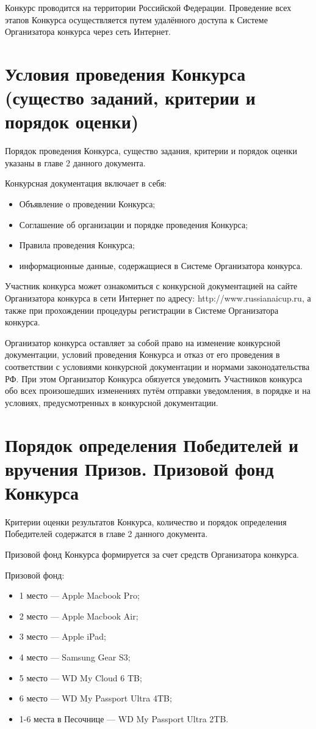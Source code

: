 Конкурс проводится на территории Российской Федерации. Проведение всех этапов Конкурса осуществляется путем удалённого доступа к Системе
Организатора конкурса через сеть Интернет.

\section{Условия проведения Конкурса (существо заданий, критерии и порядок оценки)}

Порядок проведения Конкурса, существо задания, критерии и порядок оценки указаны в главе 2 данного документа.

Конкурсная документация включает в себя:
\begin{itemize}
\item Объявление о проведении Конкурса;
\item Соглашение об организации и порядке проведения Конкурса;
\item Правила проведения Конкурса;
\item информационные данные, содержащиеся в Системе Организатора конкурса.
\end{itemize}

Участник конкурса может ознакомиться с конкурсной документацией на сайте Организатора конкурса в сети Интернет по адресу:
http://www.russianaicup.ru, а также при прохождении процедуры регистрации в Системе Организатора конкурса.

Организатор конкурса оставляет за собой право на изменение конкурсной документации, условий проведения Конкурса и отказ от его проведения в
соответствии с условиями конкурсной документации и нормами законодательства РФ. При этом Организатор Конкурса обязуется уведомить
Участников конкурса обо всех произошедших изменениях путём отправки уведомления, в порядке и на условиях, предусмотренных в конкурсной
документации.

\section{Порядок определения Победителей и вручения Призов. Призовой фонд Конкурса}

Критерии оценки результатов Конкурса, количество и порядок определения Победителей содержатся в главе 2 данного документа.

Призовой фонд Конкурса формируется за счет средств Организатора конкурса.

Призовой фонд:
\begin{itemize}
\item 1 место --- Apple Macbook Pro;
\item 2 место --- Apple Macbook Air;
\item 3 место --- Apple iPad;
\item 4 место --- Samsung Gear S3;
\item 5 место --- WD My Cloud 6 TB;
\item 6 место --- WD My Passport Ultra 4TB;
\item 1-6 места в Песочнице --- WD My Passport Ultra 2TB.
\end{itemize}

